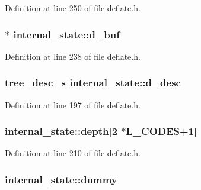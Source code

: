 Definition at line 250 of file deflate.\-h.

\hypertarget{structinternal__state_ac636c34c1c08dc9d2f9c199ce2caa99d}{
\subsubsection[{d\-\_\-buf}]{$\ast$ internal\-\_\-state\-::d\-\_\-buf}}\label{structinternal__state_ac636c34c1c08dc9d2f9c199ce2caa99d}


Definition at line 238 of file deflate.\-h.

\hypertarget{structinternal__state_ab2fddb383d3055b6ec81c7fef14e99d8}{
\subsubsection[{d\-\_\-desc}]{ {\bf tree\-\_\-desc\-\_\-s} internal\-\_\-state\-::d\-\_\-desc}}\label{structinternal__state_ab2fddb383d3055b6ec81c7fef14e99d8}


Definition at line 197 of file deflate.\-h.

\hypertarget{structinternal__state_a8e525b4f3dfa38b3bbcb8b427e333570}{
\subsubsection[{depth}]{ internal\-\_\-state\-::depth\mbox{[}2 $\ast$L\-\_\-\-C\-O\-D\-E\-S+1\mbox{]}}}\label{structinternal__state_a8e525b4f3dfa38b3bbcb8b427e333570}


Definition at line 210 of file deflate.\-h.

\hypertarget{structinternal__state_ab000a3e3c901dd063859521988ad7e52}{
\subsubsection[{dummy}]{ internal\-\_\-state\-::dummy}}\label{structinternal__state_ab000a3e3c901dd063859521988ad7e52}


